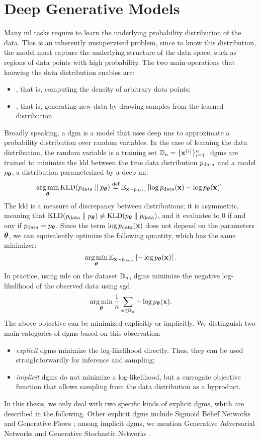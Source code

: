 \section{Deep Generative Models}
Many \gls{ml} tasks require to learn the underlying probability distribution of the data. This is an inherently unsupervised problem, since to know this distribution, the model must capture the underlying structure of the data space, such as regions of data points with high probability. The two main operations that knowing the data distribution enables are:
\begin{itemize}
    \item {}, that is, computing the density of arbitrary data points;
    \item {}, that is, generating new data by drawing samples from the learned distribution. 
\end{itemize}
Broadly speaking, a \gls{dgm} is a model that uses deep \glspl{nn} to approximate a probability distribution over random variables. In the case of learning the data distribution, the random variable is a training set $\Data_n = \Set{\VPattern{x}{i}}_{i=1}^n$. \glspl{dgm} are trained to minimize the \gls{kld} between the true data distribution $p_{\mathrm{data}}$ and a model $p_{\boldsymbol{\theta}}$, a distribution parameterized by a deep \gls{nn}:
$$\argmin_{\Param} \Fun{KLD}(\PData \;\Vert\; p_{\Param}) \defeq \Expect_{\Vector{x} \sim \PData}\Brack{\log \PData(\Vector{x}) -\log p_{\Param}(\Vector{x})}.$$
The \gls{kld} is a measure of discrepancy between distributions; it is asymmetric, meaning that $\mathrm{KLD}(p_{\mathrm{data}} \;\Vert\; p_{\boldsymbol{\theta}}) \neq \mathrm{KLD}(p_{\boldsymbol{\theta}} \;\Vert\; p_{\mathrm{data}})$, and it evaluates to 0 if and ony if $p_{\mathrm{data}} = p_{\boldsymbol{\theta}}$. Since the term $\log \PData(\Vector{x})$ does not depend on the parameters $\boldsymbol{\theta}$, we can equivalently optimize the following quantity, which has the same minimizer:
$$\argmin_{\Param} \Expect_{\Vector{x} \sim \PData}\Brack{-\log p_{\Param}(\Vector{x})}.$$
In practice, using \gls{mle} on the dataset $\mathbb{D}_n$, \glspl{dgm} minimize the negative log-likelihood of the observed data using \gls{sgd}:
$$\argmin_{\Param} \frac{1}{n} \sum_{\Vector{x} \in \Data_n}-\log p_{\Param}(\Vector{x}).$$
The above objective can be minimized explicitly or implicitly. We distinguish two main categories of \glspl{dgm} based on this observation:
\begin{itemize}
    \item \emph{explicit} \glspl{dgm} minimize the log-likelihood directly. Thus, they can be used straightforwardly for inference and sampling;
    \item \emph{implicit} \glspl{dgm} do not minimize a log-likelihood, but a surrogate objective function that allows sampling from the data distribution as a byproduct.
\end{itemize}
In this thesis, we only deal with two specific kinds of explicit \glspl{dgm}, which are described in the following. Other explicit \glspl{dgm} include Sigmoid Belief Networks \cite{} and Generative Flows \cite{}; among implicit \glspl{dgm}, we mention Generative Adversarial Networks \cite{} and Generative Stochastic Networks \cite{}.

